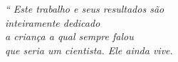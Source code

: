 \begin{epigrafe}
	\vspace*{\fill}
	\begin{flushright}
		\textit{``
		Este trabalho e seus resultados são
		\\ inteiramente dedicado 
		\\ a criança a qual sempre falou 
		\\ que seria um cientista. Ele ainda vive.}
	\end{flushright}
\end{epigrafe}
